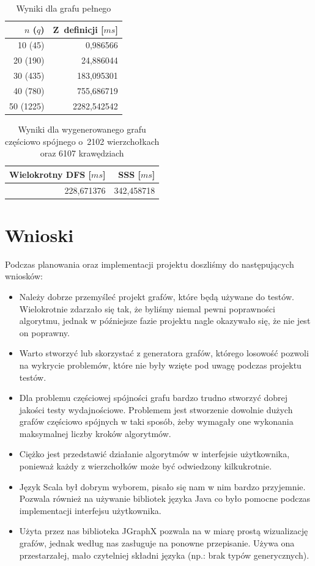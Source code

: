 \documentclass[a4paper,12pt]{mwart}
\begin{document}
\begin{table}[H]
  \centering
  \begin{tabular}{ r r }
    $n$ ($q$) & Z~definicji [$ms$] \\
    \hline
    10 (45) & 0,986566 \\
    20 (190) & 24,886044 \\
    30 (435) & 183,095301 \\
    40 (780) & 755,686719 \\
    50 (1225) & 2282,542542 \\
  \end{tabular}
  \caption{Wyniki dla grafu pełnego}
\end{table}

\begin{table}[H]
  \centering
  \begin{tabular}{ r r }
    Wielokrotny DFS [$ms$] & SSS [$ms$] \\
    \hline
    228,671376 & 342,458718 \\
  \end{tabular}
  \caption{Wyniki dla wygenerowanego grafu częściowo spójnego
    o~2102 wierzchołkach oraz 6107 krawędziach}
\end{table}

\section{Wnioski}

Podczas planowania oraz implementacji projektu doszliśmy do następujących
wniosków:

\begin{itemize}
	\item Należy dobrze przemyśleć projekt grafów, które będą używane do testów.
		Wielokrotnie zdarzało się tak, że byliśmy niemal pewni poprawności
		algorytmu, jednak w późniejsze fazie projektu nagle okazywało się, że
		nie jest on poprawny.
	\item Warto stworzyć lub skorzystać z generatora grafów, którego losowość
		pozwoli na wykrycie problemów, które nie były wzięte pod uwagę podczas
		projektu testów.
	\item Dla problemu częściowej spójności grafu bardzo trudno stworzyć dobrej
		jakości testy wydajnościowe. Problemem jest stworzenie dowolnie dużych
		grafów częściowo spójnych w taki sposób, żeby wymagały one wykonania
		maksymalnej liczby kroków algorytmów.
	\item Ciężko jest przedstawić działanie algorytmów w interfejsie
		użytkownika, ponieważ każdy z wierzchołków może być odwiedzony
		kilkukrotnie.
	\item Język Scala był dobrym wyborem, pisało się nam w nim bardzo
		przyjemnie. Pozwala również na używanie bibliotek języka Java co było
		pomocne podczas implementacji interfejsu użytkownika.
	\item Użyta przez nas biblioteka JGraphX pozwala na w miarę prostą
		wizualizację grafów, jednak według nas zasługuje na ponowne przepisanie.
		Używa ona przestarzałej, mało czytelniej składni języka (np.: brak typów
		generycznych).
\end{itemize}
\end{document}
